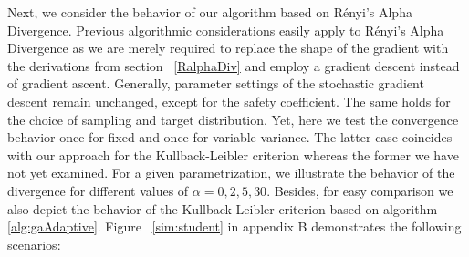 Next, we consider the behavior of our algorithm based on Rényi's Alpha Divergence. Previous algorithmic considerations easily apply to Rényi's Alpha Divergence as we are merely required to replace the shape of the gradient with the derivations from {section ~\ref{RalphaDiv}} and employ a gradient descent instead of gradient ascent. Generally, parameter settings of the stochastic gradient descent remain unchanged, except for the safety coefficient. The same holds for the choice of sampling and target distribution.
Yet, here we test the convergence behavior once for fixed and once for variable variance. The latter case coincides with our approach for the Kullback-Leibler criterion whereas the former we have not yet examined.
For a given parametrization, we illustrate the behavior of the divergence for different values of $\alpha = {0,2,5,30}$. Besides, for easy comparison we also depict the behavior of the Kullback-Leibler criterion based on algorithm \ref{alg:gaAdaptive}.
Figure ~\ref{sim:student} in appendix B demonstrates the following scenarios:
